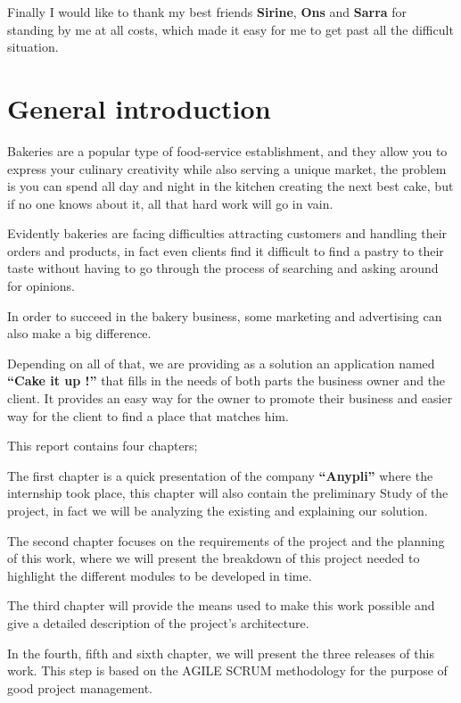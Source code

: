 \documentclass[12pt,a4paper]{report}
\begin{document}
	  Finally I would like to thank my best friends \textbf{Sirine}, \textbf{Ons} and \textbf{Sarra} for standing by me at all costs, which made it easy for me to get past all the difficult situation. \\
	\cleardoublepage
	\tableofcontents
	\cleardoublepage
	\listoffigures	
	\cleardoublepage
	\listoftables	
	\clearpage 
	\printacronyms[include-classes=abbrev,name=List of Abbreviations]
	\cleardoublepage
	\setcounter{page}{1}
	
	
	\chapter*{\centering General introduction}
	Bakeries are a popular type of food-service establishment, and they allow you to express your culinary creativity while also serving a unique market, the problem is you can spend all day and night in the kitchen creating the next best cake, but if no one knows about it, all that hard work will go in vain.  \par 
	Evidently bakeries are facing difficulties attracting customers and handling their orders and products, in fact even clients find it difficult to find a pastry to their taste without having to go through the process of searching and asking around for opinions.\par
	In order to succeed in the bakery business,  some marketing and advertising can also make a big difference.\par
	
	Depending on all of that, we are providing as a solution an application named \textbf{``Cake it up !''} that fills in the needs of both parts the business owner and the client. It provides an easy way for the owner to promote their business and easier way for the client to find a place that matches him.\par
	This report contains four chapters;\par
	The first chapter is a quick presentation of the company \textbf{``Anypli''} where the internship took place, this chapter will also contain the preliminary Study of the project, in fact we will be analyzing the existing and explaining our solution.  \par
	The second chapter focuses on the requirements of the project and the planning of this work, where we will present the breakdown of this project needed to highlight the different modules to be developed in time.\par
	The third chapter will provide the means used to make this work possible and give a detailed description of the project's architecture.
	\par
	In the fourth, fifth and sixth chapter, we will present the three releases of this work. This step is based on the AGILE SCRUM methodology for the purpose of good project management.\par
	
\end{document}
